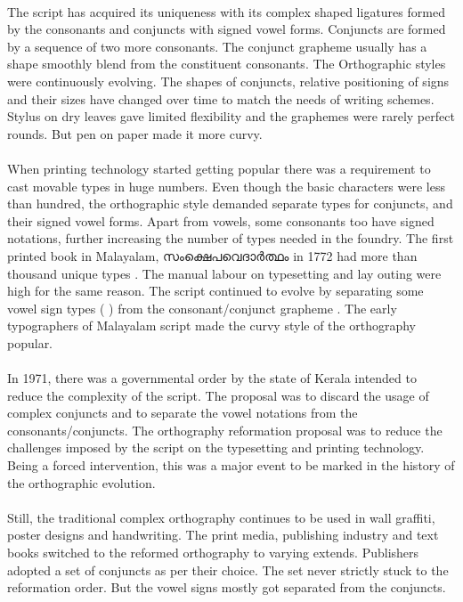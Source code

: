 \documentclass[10pt]{article}
\begin{document}
\paragraph{}
The script has acquired its uniqueness with its complex shaped ligatures formed by the consonants and conjuncts with signed vowel forms. Conjuncts are formed by a sequence of two more consonants. The conjunct grapheme usually has a shape smoothly blend from the constituent consonants. The Orthographic styles were continuously evolving. The shapes of conjuncts, relative positioning of signs and their sizes have changed over time to match the needs of writing schemes. Stylus on dry leaves gave limited flexibility and the graphemes were rarely perfect rounds. But pen on paper made it more curvy.

\paragraph{}
When printing technology started getting popular there was a requirement to cast movable types in huge numbers. Even though the basic characters were less than hundred, the orthographic style demanded separate types for conjuncts, and their signed vowel forms. Apart from vowels, some consonants too have signed notations, further increasing the number of types needed in the foundry. The first printed book in Malayalam, \begingroup \manjari സംക്ഷെപവെദാർത്ഥം \endgroup in 1772 had more than thousand unique types \cite{}. The manual labour on typesetting and lay outing were high for the same reason. The script continued to evolve by separating some vowel sign types (\begingroup {} \endgroup) from the consonant/conjunct grapheme . The early typographers of Malayalam script made the curvy style of the orthography popular. 

\paragraph{}
In 1971, there was a governmental order by the state of Kerala intended to reduce the complexity of the script. The proposal was to discard the usage of complex conjuncts and to separate the vowel notations from the consonants/conjuncts.  The orthography  reformation proposal was to reduce the challenges imposed by the script on the typesetting and printing technology. Being a forced intervention, this was a major event to be marked in the history of the orthographic evolution. 

\paragraph{}
Still, the traditional complex orthography continues to be used in wall graffiti, poster designs and handwriting. The print media, publishing industry  and text books switched to the reformed orthography to varying extends. Publishers adopted a set of conjuncts as per their choice. The set never strictly stuck to the reformation order. But the vowel signs mostly got separated from the conjuncts. 
\end{document}
